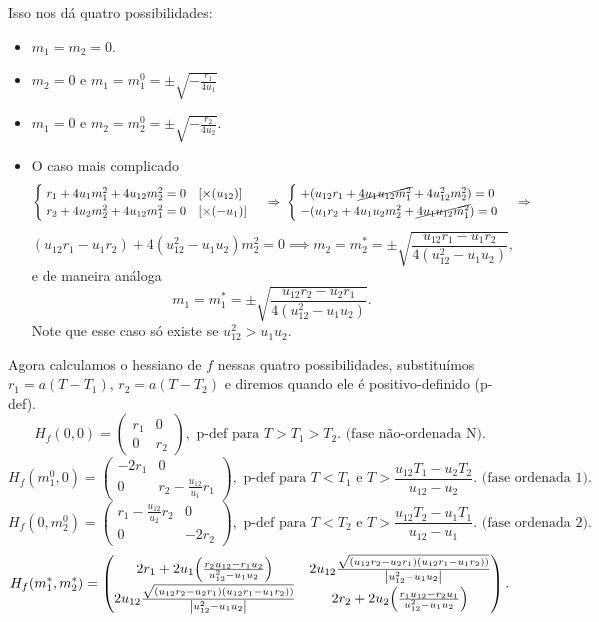 \documentclass[a4paper,10pt]{article}
\begin{document}
Isso nos dá quatro possibilidades:
\begin{itemize}
\item $m_1 = m_2 = 0$.
\item $m_2 = 0$ e $m_1 = m^0_1 = \pm\sqrt{-\frac{r_1}{4 u_1}}$
\item $m_1 = 0$ e $m_2 = m^0_2 = \pm\sqrt{-\frac{r_2}{4 u_2}}$.
\item O caso mais complicado
$$
\begin{cases}
\; r_1 + 4 u_1 m_1^2 + 4 u_{12} m_2^2 = 0 \quad [\times (u_{12})] \\
\; r_2 + 4 u_2 m_2^2 + 4 u_{12} m_1^2 = 0 \quad [\times (-u_{1})]
\end{cases}
\implies
\begin{cases}
\; + (u_{12} r_1 + \cancel{4 u_1 u_{12} m_1^2} + 4 u_{12}^2 m_2^2) = 0 \\
\; - (u_1 r_2 + 4 u_1 u_2 m_2^2 + \cancel{4 u_1 u_{12} m_1^2}) = 0
\end{cases}
\implies
$$
$$
(u_{12} r_1 - u_1 r_2) + 4 (u_{12}^2 - u_1 u_2) m_2^2 = 0 \implies
m_2 = m_2^* = \pm \sqrt{\frac{u_{12} r_1 - u_1 r_2}{4 (u_{12}^2 - u_1 u_2)}},
$$
e de maneira análoga
$$
m_1 = m_1^* = \pm \sqrt{\frac{u_{12} r_2 - u_2 r_1}{4 (u_{12}^2 - u_1 u_2)}}.
$$
Note que esse caso só existe se $\boxed{u_{12}^2 > u_1 u_2}$.
\end{itemize}

Agora calculamos o hessiano de $f$ nessas quatro possibilidades, substituímos $r_1 = a(T-T_1)$, $r_2 = a(T-T_2)$ e diremos quando ele é positivo-definido (p-def).
$$
H_f(0, 0) =
\begin{pmatrix}
r_1 & 0 \\
0 & r_2
\end{pmatrix},
\text{ p-def para } T > T_1 > T_2. \text{ (fase não-ordenada N)}.
$$
$$
H_f(m_1^0, 0) =
\begin{pmatrix}
-2 r_1 & 0 \\
0 & r_2 - \frac{u_{12}}{u_1} r_1
\end{pmatrix},
\text{ p-def para } T < T_1 \text{ e } T > \frac{u_{12} T_1 - u_2 T_2}{u_{12} - u_2}. \text{ (fase ordenada 1)}.
$$
$$
H_f(0, m_2^0) =
\begin{pmatrix}
r_1 - \frac{u_{12}}{u_2} r_2 & 0 \\
0 & -2 r_2
\end{pmatrix},
\text{ p-def para } T < T_2 \text{ e } T > \frac{u_{12} T_2 - u_1 T_1}{u_{12} - u_1}. \text{ (fase ordenada 2)}.
$$
$$
H_f(m_1^*, m_2^*) =
\begin{pmatrix}
2 r_1 + 2 u_1 \qty(\frac{r_2 u_{12} - r_1 u_2}{u_{12}^2-u_1 u_2}) &
2 u_{12} \frac{\sqrt{(u_{12} r_2 - u_2 r_1)(u_{12} r_1 - u_1 r_2))}}{\abs{u_{12}^2 - u_1 u_2}} \\
2 u_{12} \frac{\sqrt{(u_{12} r_2 - u_2 r_1)(u_{12} r_1 - u_1 r_2))}}{\abs{u_{12}^2 - u_1 u_2}} &
2 r_2 + 2 u_2 \qty(\frac{r_1 u_{12} - r_2 u_1}{u_{12}^2-u_1 u_2})
\end{pmatrix}.
$$





%


\end{document}
